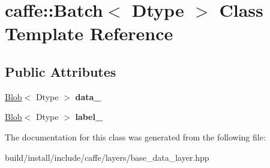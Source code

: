 \hypertarget{classcaffe_1_1_batch}{}\section{caffe\+:\+:Batch$<$ Dtype $>$ Class Template Reference}
\label{classcaffe_1_1_batch}
\subsection*{Public Attributes}
\begin{DoxyCompactItemize}
\item 
\mbox{\label{classcaffe_1_1_batch_a40f6ffc2807dacbed80b5a6713faaaaa}} 
\mbox{\hyperlink{classcaffe_1_1_blob}{Blob}}$<$ Dtype $>$ {\bfseries data\+\_\+}
\item 
\mbox{\label{classcaffe_1_1_batch_a58720614385f46790cf29f1faac476f9}} 
\mbox{\hyperlink{classcaffe_1_1_blob}{Blob}}$<$ Dtype $>$ {\bfseries label\+\_\+}
\end{DoxyCompactItemize}


The documentation for this class was generated from the following file\+:\begin{DoxyCompactItemize}
\item 
build/install/include/caffe/layers/base\+\_\+data\+\_\+layer.\+hpp\end{DoxyCompactItemize}
